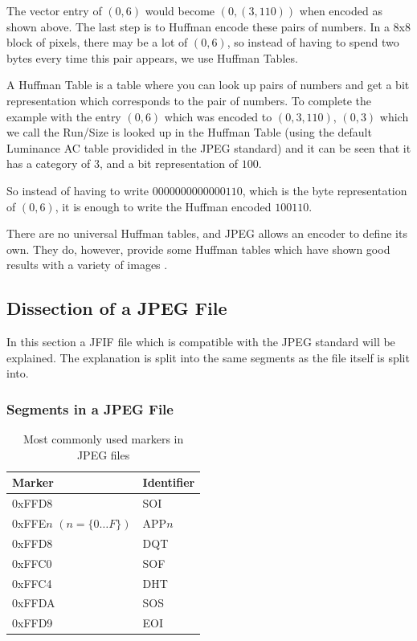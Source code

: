 \begin{infobox}
The vector entry of $(0,6)$ would become $(0,(3,110))$ when encoded as shown above.
The last step is to Huffman encode these pairs of numbers.
In a 8x8 block of pixels, there may be a lot of $(0,6)$, so instead of having to spend two bytes every time this pair appears, we use Huffman Tables. 

A Huffman Table is a table where you can look up pairs of numbers and get a bit representation which corresponds to the pair of numbers.
To complete the example with the entry $(0,6)$ which was encoded to $(0,3,110)$, $(0,3)$ which we call the Run/Size is looked up in the Huffman Table (using the default Luminance AC table providided in the JPEG standard) and it can be seen that it has a category of $3$, and a bit representation of $100$. 

So instead of having to write $0000 0000 0000 0110$, which is the byte representation of $(0,6)$, it is enough to write the Huffman encoded $100110$.

There are no universal Huffman tables, and JPEG allows an encoder to define its own.
They do, however, provide some Huffman tables which have shown good results with a variety of images \citep[p.
153]{JPEGStandard}. 

\vspace{4mm}
\subsection{Dissection of a JPEG File}
\vspace{-2.5mm}
In this section a JFIF file which is compatible with the JPEG standard will be explained.
The explanation is split into the same segments as the file itself is split into.
\newpage
\subsubsection{Segments in a JPEG File}
\begin{table}
\caption{Most commonly used markers in JPEG files}
\label{tab:markers}
\begin{tabular}{|p{2.7cm}|l|}
\hline
Marker & Identifier\\ \hline
0xFFD8 & SOI\\ \hline
0xFFE$n$ \newline$(n = \{0 \ldots F\})$ & APP$n$\\ \hline
0xFFD8 & DQT \\ \hline
0xFFC0 & SOF \\ \hline
0xFFC4 & DHT\\ \hline
0xFFDA & SOS\\ \hline
0xFFD9 & EOI\\ \hline 
\end{tabular}
\end{table}


\end{infobox}
